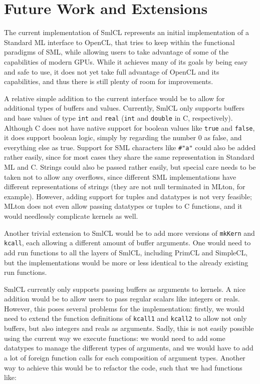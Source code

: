 \section{Future Work and Extensions}
\label{futurework}

The current implementation of SmlCL represents an initial
implementation of a Standard ML interface to OpenCL, that tries to
keep within the functional paradigms of SML, while allowing users to
take advantage of some of the capabilities of modern GPUs. While it
achieves many of its goals by being easy and safe to use, it does not
yet take full advantage of OpenCL and its capabilities, and thus there
is still plenty of room for improvements.

A relative simple addition to the current interface would be to
allow for additional types of buffers and values. Currently, SmlCL
only supports buffers and base values of type \texttt{int} and
\texttt{real} (\texttt{int} and \texttt{double} in C,
respectively). Although C does not have native support for boolean
values like \texttt{true} and \texttt{false}, it does support boolean
logic, simply by regarding the number $0$ as false, and everything
else as true.  Support for SML characters like \texttt{\#"a"} could
also be added rather easily, since for most cases they share the same
representation in Standard ML and C. Strings could also be passed
rather easily, but special care needs to be taken not to allow
any overflows, since different SML implementations have different
representations of strings (they are not null terminated in MLton, for
example). However, adding support for tuples and datatypes is not very
feasible; MLton does not even allow passing datatypes or tuples to C
functions, and it would needlessly complicate kernels as well.

Another trivial extension to SmlCL would be to add more versions of
\texttt{mkKern} and \texttt{kcall}, each allowing a different amount
of buffer arguments. One would need to add run functions to all the
layers of SmlCL, including PrimCL and SimpleCL, but the
implementations would be more or less identical to the already
existing run functions.

SmlCL currently only supports passing buffers as arguments to
kernels. A nice addition would be to allow users to pass regular
scalars like integers or reals. However, this poses several problems
for the implementation: firstly, we would need to extend the function
definitions of \texttt{kcall1} and \texttt{kcall2} to allow not only
buffers, but also integers and reals as arguments. Sadly, this is not
easily possible using the current way we execute functions: we would
need to add some datatypes to manage the different types of arguments,
and we would have to add a lot of foreign function calls for each
composition of argument types. Another way to achieve this would be to
refactor the code, such that we had functions like:

